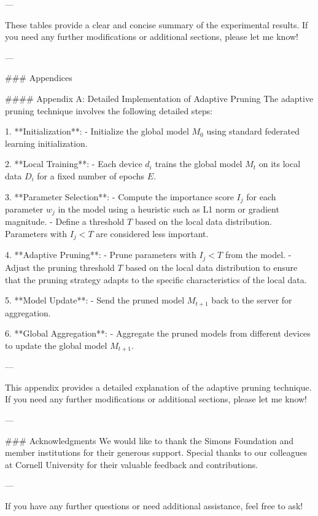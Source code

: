 ---

These tables provide a clear and concise summary of the experimental results. If you need any further modifications or additional sections, please let me know! 

--- 

\newpage

### Appendices

#### Appendix A: Detailed Implementation of Adaptive Pruning
The adaptive pruning technique involves the following detailed steps:

1. **Initialization**:
   - Initialize the global model \( M_0 \) using standard federated learning initialization.

2. **Local Training**:
   - Each device \( d_i \) trains the global model \( M_t \) on its local data \( D_i \) for a fixed number of epochs \( E \).

3. **Parameter Selection**:
   - Compute the importance score \( I_j \) for each parameter \( w_j \) in the model using a heuristic such as L1 norm or gradient magnitude.
   - Define a threshold \( T \) based on the local data distribution. Parameters with \( I_j < T \) are considered less important.

4. **Adaptive Pruning**:
   - Prune parameters with \( I_j < T \) from the model.
   - Adjust the pruning threshold \( T \) based on the local data distribution to ensure that the pruning strategy adapts to the specific characteristics of the local data.

5. **Model Update**:
   - Send the pruned model \( M_{t+1} \) back to the server for aggregation.

6. **Global Aggregation**:
   - Aggregate the pruned models from different devices to update the global model \( M_{t+1} \).

---

This appendix provides a detailed explanation of the adaptive pruning technique. If you need any further modifications or additional sections, please let me know! 

--- 

\newpage

### Acknowledgments
We would like to thank the Simons Foundation and member institutions for their generous support. Special thanks to our colleagues at Cornell University for their valuable feedback and contributions.

---

If you have any further questions or need additional assistance, feel free to ask! 

